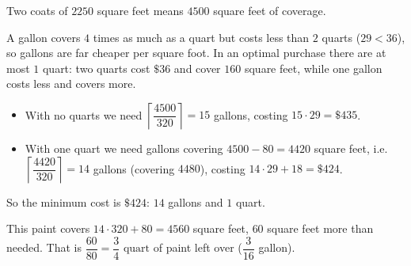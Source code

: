 Two coats of $2250$ square feet means $4500$ square feet of coverage.

A gallon covers $4$ times as much as a quart but costs less than $2$ quarts ($29<36$), so gallons are far cheaper per square foot. In an optimal purchase there are at most $1$ quart: two quarts cost $\$36$ and cover $160$ square feet, while one gallon costs less and covers more.
\begin{itemize}
\item With no quarts we need $\left\lceil\dfrac{4500}{320}\right\rceil=15$ gallons, costing $15\cdot29=\$435$.
\item With one quart we need gallons covering $4500-80=4420$ square feet, i.e.\ $\left\lceil\dfrac{4420}{320}\right\rceil=14$ gallons (covering $4480$), costing $14\cdot29+18=\$424$.
\end{itemize}
So the minimum cost is $\boxed{\$424}$: $14$ gallons and $1$ quart.

This paint covers $14\cdot320+80=4560$ square feet, $60$ square feet more than needed. That is $\dfrac{60}{80}=\boxed{\dfrac{3}{4}\text{ quart}}$ of paint left over ($\dfrac{3}{16}$ gallon).
